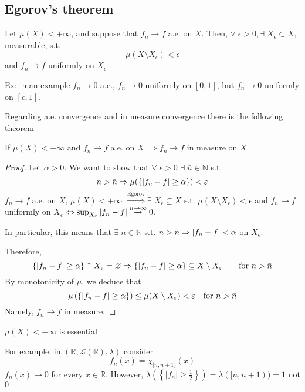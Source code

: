 \subsection{Egorov's theorem}
\begin{theorem}[Egorov]
    Let \(\mu(X) < +\infty\), and suppose that \(f_n \to f\) a.e. on \(X\). Then, \(\forall \; \epsilon > 0, \exists \; X_{\epsilon} \subset X\), measurable, s.t. 
    \[
        \mu(X \setminus X_{\epsilon}) < \epsilon
    \]
    and \(f_n \to f\) uniformly on \(X_{\epsilon}\)
\end{theorem}
\noindent\underline{Ex}: in an example \(f_n \to 0\) a.e., \(f_n \to 0\) uniformly on \([0,1]\), but \(f_n \to 0\) uniformly on \([\epsilon, 1]\).

Regarding a.e. convergence and in measure convergence there is the following theorem
\begin{theorem}
    If \(\mu(X) < +\infty\) and \(f_n \to f\) a.e. on \(X\) \(\Rightarrow f_n \to f\) in measure on \(X\)
\end{theorem}
\begin{proof}
    Let \(\alpha > 0\). We want to show that \(\forall \; \epsilon > 0\) \(\exists \; \bar{n} \in \mathbb{N}\) s.t. 
    \[
        n > \bar{n} \Rightarrow \mu(\left\lbrace \abs{f_n -f} \geq \alpha\right\rbrace) <\varepsilon
    \]
    \(f_n \to f\) a.e. on \(X\), \(\mu(X) < +\infty\) \(\overset{\text{Egorov}}{\Rightarrow} \exists \; X_{\epsilon} \subseteq X\) s.t. \(\mu(X \setminus X_{\epsilon}) < \epsilon\) and \(f_n \to f\) uniformly on \(X_{\epsilon}\) \(\Leftrightarrow \sup_{X_{\varepsilon}} \abs{f_n - f} \overset{n\to \infty}{\to} 0\).

    In particular, this means that \(\exists \; \bar{n} \in \mathbb{N}\) s.t. \(n > \bar{n} \Rightarrow \abs{f_n -f} < \alpha\) on \(X_{\epsilon}\).

    Therefore, 
    \[
        \left\{ \abs{f_n -f} \geq \alpha \right\} \cap  X_{\varepsilon} = \varnothing \Rightarrow \left\{ \abs{f_n -f} \geq \alpha \right\} \subseteq X \setminus X_{\varepsilon} \qquad \text{for } n> \bar{n} 
    \]
    By monotonicity of \(\mu\), we deduce that
    \[
        \mu\left(\left\{ \abs{f_n -f} \geq \alpha \right\}\right) \leq \mu(X \setminus X_{\varepsilon}) < \varepsilon \quad \mbox{for }n> \bar{n}
    \]
    Namely, \(f_n \to f\) in measure.
\end{proof}
\begin{remark}
    \(\mu(X) < +\infty\) is essential
\end{remark}
For example, in \((\mathbb{R}, \mathcal{L}(\mathbb{R}), \lambda)\) consider
\[
    f_n (x) = \chi_{[n, n+1)}(x)
\]
\(f_n(x) \to 0\) for every \(x \in \mathbb{R}\). However, \(\lambda(\left\lbrace \vert f_n \vert \geq \frac{1}{2}\right\rbrace) = \lambda([n, n+1)) = 1\) not \(0\)
